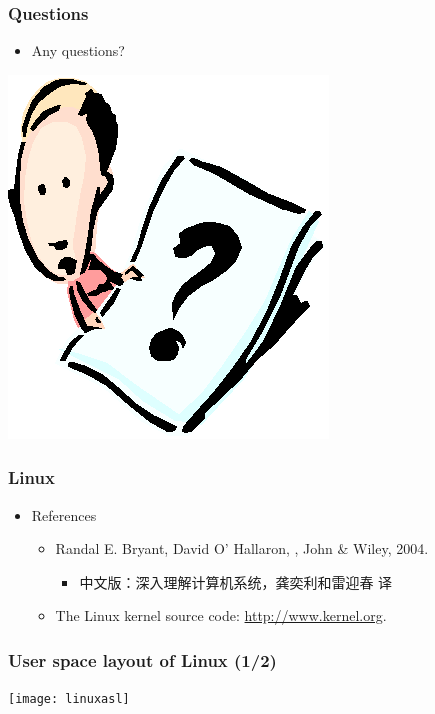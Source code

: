 \documentclass[CJKutf8,xcolor=pdftex,dvipsnames,table]{beamer}
\begin{document}
\begin{CJK*}{UTF8}{song}
  \begin{frame}
    \frametitle{Questions}
    \begin{itemize}
    \item{Any questions?}
    \end{itemize}
    \begin{center}
      \includegraphics[scale=.5]{question}
    \end{center}
  \end{frame}
  
  \begin{frame}
    \frametitle{Linux} \pause
    \begin{itemize}
    \item{References} \pause
      \begin{itemize}
      \item{Randal E. Bryant, David O' Hallaron, , John \& Wiley, 2004.} \pause
        \begin{itemize}
        \item{中文版：深入理解计算机系统，龚奕利和雷迎春 译} \pause
        \end{itemize}
      \item{The Linux kernel source code: \url{http://www.kernel.org}.}
      \end{itemize}
    \end{itemize}
  \end{frame}
  
  \begin{frame}
    \frametitle{User space layout of Linux (1/2)} \pause
    \begin{center}
      \texttt{[image: linuxasl]}
    \end{center}
  \end{frame}


\end{CJK*}
\end{document}
